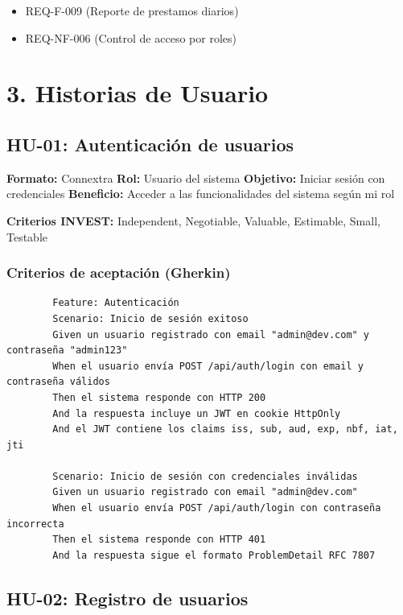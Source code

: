 \documentclass[
11pt,
a4paper,
]{report}
\providecommand{\tightlist}{%
	\setlength{\itemsep}{0pt}\setlength{\parskip}{0pt}}
\begin{document}
	\begin{itemize}
		\tightlist
		\item
		REQ-F-009 (Reporte de prestamos diarios)
		\item
		REQ-NF-006 (Control de acceso por roles)
	\end{itemize}
	
	\hypertarget{historias-de-usuario}{%
		\chapter{3. Historias de Usuario}\label{historias-de-usuario}}
	
	\hypertarget{hu-01-autenticaciuxf3n-de-usuarios}{%
		\section{HU-01: Autenticación de usuarios}\label{hu-01-autenticaciuxf3n-de-usuarios}}
	
	\textbf{Formato:} Connextra
	\textbf{Rol:} Usuario del sistema
	\textbf{Objetivo:} Iniciar sesión con credenciales
	\textbf{Beneficio:} Acceder a las funcionalidades del sistema según mi rol
	
	\textbf{Criterios INVEST:} Independent, Negotiable, Valuable, Estimable, Small, Testable
	
	\hypertarget{criterios-de-aceptaciuxf3n-gherkin}{%
		\subsection{Criterios de aceptación (Gherkin)}\label{criterios-de-aceptaciuxf3n-gherkin}}
	
	\begin{lstlisting}
		Feature: Autenticación
		Scenario: Inicio de sesión exitoso
		Given un usuario registrado con email "admin@dev.com" y contraseña "admin123"
		When el usuario envía POST /api/auth/login con email y contraseña válidos
		Then el sistema responde con HTTP 200
		And la respuesta incluye un JWT en cookie HttpOnly
		And el JWT contiene los claims iss, sub, aud, exp, nbf, iat, jti
		
		Scenario: Inicio de sesión con credenciales inválidas
		Given un usuario registrado con email "admin@dev.com"
		When el usuario envía POST /api/auth/login con contraseña incorrecta
		Then el sistema responde con HTTP 401
		And la respuesta sigue el formato ProblemDetail RFC 7807
	\end{lstlisting}
	
	\hypertarget{hu-02-registro-de-usuarios}{%
		\section{HU-02: Registro de usuarios}\label{hu-02-registro-de-usuarios}}
	
\end{document}
